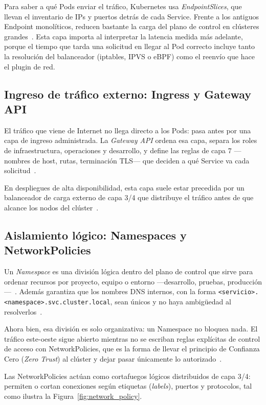 Para saber a qué Pods enviar el tráfico, Kubernetes usa \emph{EndpointSlices}, que llevan el inventario de IPs y puertos detrás de cada Service. Frente a los antiguos Endpoint monolíticos, reducen bastante la carga del plano de control en clústeres grandes~\cite{ref1}. Esta capa importa al interpretar la latencia medida más adelante, porque el tiempo que tarda una solicitud en llegar al Pod correcto incluye tanto la resolución del balanceador (iptables, IPVS o eBPF) como el reenvío que hace el plugin de red.

\subsection{Ingreso de tráfico externo: Ingress y Gateway API}

El tráfico que viene de Internet no llega directo a los Pods: pasa antes por una capa de ingreso administrada. La \emph{Gateway API} ordena esa capa, separa los roles de infraestructura, operaciones y desarrollo, y define las reglas de capa 7 ---nombres de host, rutas, terminación TLS--- que deciden a qué Service va cada solicitud~\cite{ref17}.

En despliegues de alta disponibilidad, esta capa suele estar precedida por un balanceador de carga externo de capa 3/4 que distribuye el tráfico antes de que alcance los nodos del clúster~\cite{ref5}.

\subsection{Aislamiento lógico: Namespaces y NetworkPolicies}

Un \emph{Namespace} es una división lógica dentro del plano de control que sirve para ordenar recursos por proyecto, equipo o entorno ---desarrollo, pruebas, producción---~\cite{ref2}. Además garantiza que los nombres DNS internos, con la forma \texttt{<servicio>.<namespace>.svc.cluster.local}, sean únicos y no haya ambigüedad al resolverlos~\cite{ref13,ref2}.

Ahora bien, esa división es solo organizativa: un Namespace no bloquea nada. El tráfico este-oeste sigue abierto mientras no se escriban reglas explícitas de control de acceso con NetworkPolicies, que es la forma de llevar el principio de Confianza Cero (\emph{Zero Trust}) al clúster y dejar pasar únicamente lo autorizado~\cite{ref4,ref24,ref25,ref26}.

Las NetworkPolicies actúan como cortafuegos lógicos distribuidos de capa 3/4: permiten o cortan conexiones según etiquetas (\emph{labels}), puertos y protocolos, tal como ilustra la Figura~\ref{fig:network_policy}.

